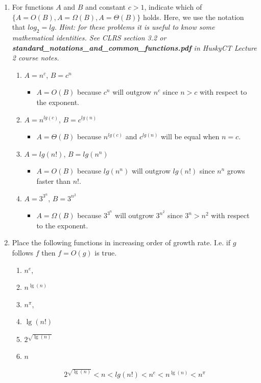 \documentclass[12pt,letterpaper]{article}
\begin{document}
\begin{enumerate}
    \item For functions $A$ and $B$ and constant $c>1$, indicate which of $\{A = O(B),A = \Omega(B),A = \Theta(B)\}$ holds. Here, we use the notation that $log_2=lg$. \textit{Hint: for these problems it is useful to know some mathematical identities. See CLRS section 3.2 or \textbf{standard\_notations\_and\_common\_functions.pdf} in HuskyCT Lecture 2 course notes.} 
    \begin{enumerate}
        \item $A=n^c$, $B=c^n$
        \begin{itemize}
            \item $A = O(B)$ because $c^n$ will outgrow $n^c$ since $n > c$ with respect to the exponent.
        \end{itemize}
        \item $A=n^{lg(c)}$, $B=c^{lg(n)}$
        \begin{itemize}
            \item $A = \Theta(B)$ because $n^{lg(c)}$ and $c^{lg(n)}$ will be equal when $n = c$.
        \end{itemize}
        \item $A=lg(n!)$, $B=lg(n^n)$
        \begin{itemize}
            \item $A = O(B)$ because $lg(n^n)$ will outgrow $lg(n!)$ since $n^n$ grows faster than $n!$.
        \end{itemize}
        \item $A=3^{3^n}$, $B=3^{n^2}$
        \begin{itemize}
            \item $A = \Omega(B)$ because $3^{3^n}$ will outgrow $3^{n^2}$ since $3^n > n^2$ with respect to the exponent.
        \end{itemize}
    \end{enumerate}
    \vspace{1in}
    \item Place the following functions in increasing order of growth rate. I.e. if $g$ follows $f$ then $f=O(g)$ is true.
    \begin{enumerate}
        \item $n^e$, 
        \item $n^{\lg(n)}$
        \item $n^\pi$, 
        \item $\lg(n!)$
        \item $2^{\sqrt{\lg(n)}}$
        \item $n$
    \end{enumerate}

    $$
        2^{\sqrt{\lg(n)}} < n < lg(n!) < n^e < n^{\lg(n)} < n^\pi
    $$
\end{enumerate}
\end{document}
